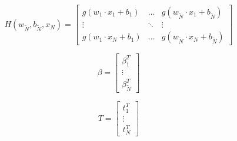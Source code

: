 \begin{equation}
	H(w_{\tilde{N}}, b_{\tilde{N}}, x_N)=
	\begin{bmatrix}
		 g(w_1 \cdot x_1 + b_1) & \dots & g(w_{\tilde{N}} \cdot x_1 + b_{\tilde{N}} )\\
		 \vdots & \ddots & \vdots\\
		 g(w_1 \cdot x_N + b_1) & \dots & g(w_{\tilde{N}} \cdot x_N + b_{\tilde{N}} )
	\end{bmatrix}\label{eq:equation5}
\end{equation}

\begin{equation}
	\beta =
	\begin{bmatrix}
		\beta_{1}^T \\
		\vdots \\
		\beta_{\tilde{N}}^T
	\end{bmatrix}\label{eq:equation6}
\end{equation}

\begin{equation}
	T =
	\begin{bmatrix}
		t_{1}^T \\
		\vdots \\
		t_{N}^T
	\end{bmatrix}\label{eq:equation7}
\end{equation}

